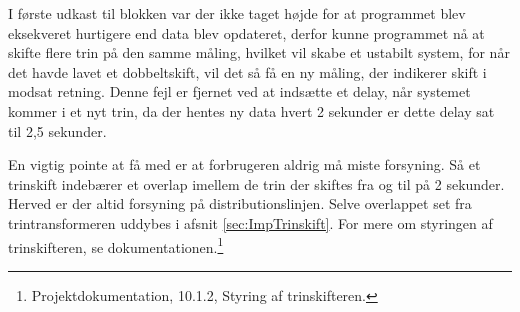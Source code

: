 I første udkast til blokken var der ikke taget højde for at programmet blev eksekveret hurtigere end data blev opdateret, derfor kunne programmet nå at skifte flere trin på den samme måling, hvilket vil skabe et ustabilt system, for når det havde lavet et dobbeltskift, vil det så få en ny måling, der indikerer skift i modsat retning. Denne fejl er fjernet ved at indsætte et delay, når systemet kommer i et nyt trin, da der hentes ny data hvert 2 sekunder er dette delay sat til 2,5 sekunder.


En vigtig pointe at få med er at forbrugeren aldrig må miste forsyning. Så et trinskift indebærer et overlap imellem de trin der skiftes fra og til på 2 sekunder. Herved er der altid forsyning på distributionslinjen. Selve overlappet set fra trintransformeren uddybes i afsnit \ref{sec:ImpTrinskift}.
For mere om styringen af trinskifteren, se dokumentationen.\footnote{Projektdokumentation, 10.1.2, Styring af trinskifteren.}
